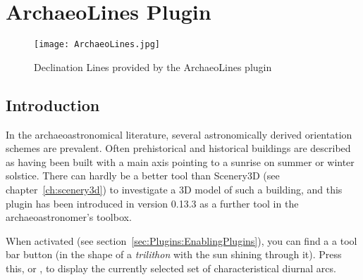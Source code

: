 

% 
% 
% 
\newpage
\section{ArchaeoLines Plugin}
\label{sec:plugin:ArchaeoLines}
\begin{figure}[ht]
\texttt{[image: ArchaeoLines.jpg]}
\caption{Declination Lines provided by the ArchaeoLines plugin}
\label{fig:plugin:ArchaeoLines}
\end{figure}


\subsection{Introduction}
\label{sec:plugin:ArchaeoLines:Introduction}

In the archaeoastronomical literature, several astronomically derived
orientation schemes are prevalent. Often prehistorical and historical
buildings are described as having been built with a main axis pointing
to a sunrise on summer or winter solstice. There can hardly be a
better tool than Scenery3D (see chapter~\ref{ch:scenery3d}) to
investigate a 3D model of such a building, and this plugin has been
introduced in version 0.13.3 as a further tool in the
archaeoastronomer's toolbox\cite{Zotti:SEAC2015}.

When activated (see section~\ref{sec:Plugins:EnablingPlugins}), you
can find a a tool bar button  (in the
shape of a \emph{trilithon} with the sun shining through it). Press
this, or , to display the currently selected set of
characteristical diurnal arcs.

